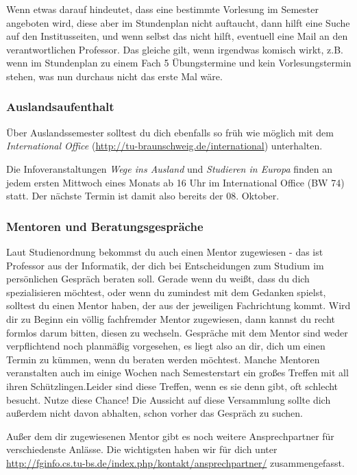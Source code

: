 \begin{multicols}{2}
	Wenn etwas darauf hindeutet, dass eine bestimmte Vorlesung im Semester angeboten wird, diese aber im Stundenplan nicht auftaucht, dann hilft eine Suche auf den Institusseiten, und wenn selbst das nicht hilft, eventuell eine Mail an den verantwortlichen Professor. Das gleiche gilt, wenn irgendwas komisch wirkt, z.B. wenn im Stundenplan zu einem Fach 5 Übungstermine und kein Vorlesungstermin stehen, was nun durchaus nicht das erste Mal wäre.

\subsubsection{Auslandsaufenthalt}
	Über Auslandssemester solltest du dich ebenfalls so früh wie möglich mit dem \emph{International Office} (\url{http://tu-braunschweig.de/international}) unterhalten.

	Die Infoveranstaltungen \emph{Wege ins Ausland} und \emph{Studieren in Europa} finden an jedem ersten Mittwoch eines Monats ab 16 Uhr im International Office (BW 74) statt. Der nächste Termin ist damit also bereits der 08. Oktober.

\subsubsection{Mentoren und Beratungsgespräche}
	Laut Studienordnung bekommst du auch einen Mentor zugewiesen - das ist Professor aus der Informatik, der dich bei Entscheidungen zum Studium im persönlichen Gespräch beraten soll. Gerade wenn du weißt, dass du dich spezialisieren möchtest, oder wenn du zumindest mit dem Gedanken spielst, solltest du einen Mentor haben, der aus der jeweiligen Fachrichtung kommt. Wird dir zu Beginn ein völlig fachfremder Mentor zugewiesen, dann kannst du recht formlos darum bitten, diesen zu wechseln. Gespräche mit dem Mentor sind weder verpflichtend noch planmäßig vorgesehen, es liegt also an dir, dich um einen Termin zu kümmen, wenn du beraten werden möchtest. Manche Mentoren veranstalten auch im einige Wochen nach Semesterstart ein großes Treffen mit all ihren Schützlingen.Leider sind diese Treffen, wenn es sie denn gibt, oft schlecht besucht. Nutze diese Chance! Die Aussicht auf diese Versammlung sollte dich außerdem nicht davon abhalten, schon vorher das Gespräch zu suchen.

	Außer dem dir zugewiesenen Mentor gibt es noch weitere Ansprechpartner für verschiedenste Anlässe. Die wichtigsten haben wir für dich unter \url{http://fginfo.cs.tu-bs.de/index.php/kontakt/ansprechpartner/} zusammengefasst.
\end{multicols}